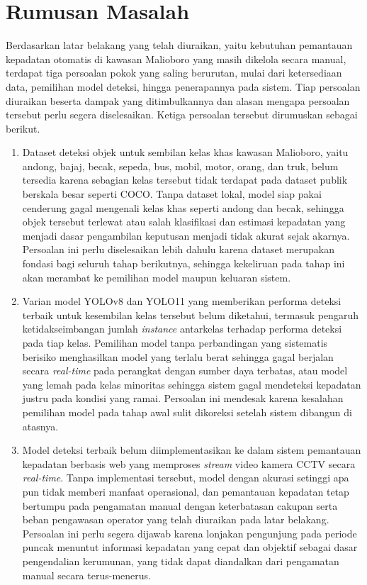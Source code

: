 \section{Rumusan Masalah}

Berdasarkan latar belakang yang telah diuraikan, yaitu kebutuhan pemantauan kepadatan 
otomatis di kawasan Malioboro yang masih dikelola secara manual, terdapat tiga persoalan 
pokok yang saling berurutan, mulai dari ketersediaan data, pemilihan model deteksi, hingga 
penerapannya pada sistem. Tiap persoalan diuraikan beserta dampak yang ditimbulkannya dan 
alasan mengapa persoalan tersebut perlu segera diselesaikan. Ketiga persoalan tersebut 
dirumuskan sebagai berikut.

\begin{enumerate}
    \item Dataset deteksi objek untuk sembilan kelas khas kawasan Malioboro, yaitu andong, bajaj, becak, sepeda, bus, mobil, motor, orang, dan truk, belum tersedia karena sebagian kelas tersebut tidak terdapat pada dataset publik berskala besar seperti COCO. Tanpa dataset lokal, model siap pakai cenderung gagal mengenali kelas khas seperti andong dan becak, sehingga objek tersebut terlewat atau salah klasifikasi dan estimasi kepadatan yang menjadi dasar pengambilan keputusan menjadi tidak akurat sejak akarnya. Persoalan ini perlu diselesaikan lebih dahulu karena dataset merupakan fondasi bagi seluruh tahap berikutnya, sehingga kekeliruan pada tahap ini akan merambat ke pemilihan model maupun keluaran sistem.
    \item Varian model YOLOv8 dan YOLO11 yang memberikan performa deteksi terbaik untuk kesembilan kelas tersebut belum diketahui, termasuk pengaruh ketidakseimbangan jumlah \textit{instance} antarkelas terhadap performa deteksi pada tiap kelas. Pemilihan model tanpa perbandingan yang sistematis berisiko menghasilkan model yang terlalu berat sehingga gagal berjalan secara \textit{real-time} pada perangkat dengan sumber daya terbatas, atau model yang lemah pada kelas minoritas sehingga sistem gagal mendeteksi kepadatan justru pada kondisi yang ramai. Persoalan ini mendesak karena kesalahan pemilihan model pada tahap awal sulit dikoreksi setelah sistem dibangun di atasnya.
    \item Model deteksi terbaik belum diimplementasikan ke dalam sistem pemantauan kepadatan berbasis web yang memproses \textit{stream} video kamera CCTV secara \textit{real-time}. Tanpa implementasi tersebut, model dengan akurasi setinggi apa pun tidak memberi manfaat operasional, dan pemantauan kepadatan tetap bertumpu pada pengamatan manual dengan keterbatasan cakupan serta beban pengawasan operator yang telah diuraikan pada latar belakang. Persoalan ini perlu segera dijawab karena lonjakan pengunjung pada periode puncak menuntut informasi kepadatan yang cepat dan objektif sebagai dasar pengendalian kerumunan, yang tidak dapat diandalkan dari pengamatan manual secara terus-menerus.
\end{enumerate}

